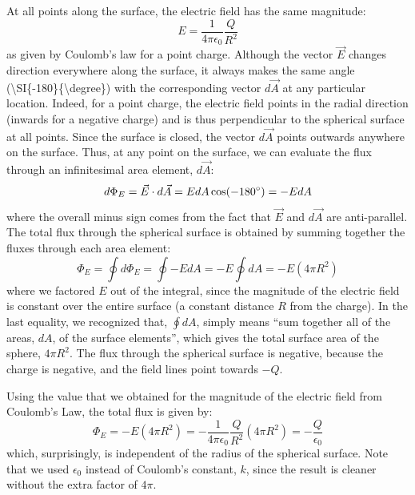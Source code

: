 \begin{framed}
\begin{framed}
At all points along the surface, the electric field has the same magnitude:
\begin{equation}
E=\frac{1}{4\pi\epsilon_0}\frac{Q}{R^2}
\end{equation}
as given by Coulomb's law for a point charge. Although the vector $\vec E$ changes direction everywhere along the surface, it always makes the same angle ({\textbackslash}SI\{-180\}\{{\textbackslash}degree\}) with the corresponding vector $d\vec A$ at any particular location. Indeed, for a point charge, the electric field points in the radial direction (inwards for a negative charge) and is thus perpendicular to the spherical surface at all points. Since the surface is closed, the vector $d\vec A$ points outwards anywhere on the surface. Thus, at any point on the surface, we can evaluate the flux through an infinitesimal area element, $d\vec A$:
\begin{equation}
d\Phi_E=\vec E\cdot d\vec A=EdA\cos(-180\degree)=-EdA
\end{equation}
where the overall minus sign comes from the fact that $\vec E$ and $d\vec A$ are anti-parallel. The total flux through the spherical surface is obtained by summing together the fluxes through each area element:
\begin{equation}
\Phi_E=\oint d\Phi_E=\oint -EdA=-E\oint dA=-E(4\pi R^2)
\end{equation}
where we factored $E$ out of the integral, since the magnitude of the electric field is constant over the entire surface (a constant distance $R$ from the charge). In the last equality, we recognized that, $\oint dA$, simply means ``sum together all of the areas, $dA$, of the surface elements'', which gives the total surface area of the sphere, $4\pi R^2$. The flux through the spherical surface is negative, because the charge is negative, and the field lines point towards $-Q$.

Using the value that we obtained for the magnitude of the electric field from Coulomb's Law, the total flux is given by:
\begin{equation}
\Phi_E=-E(4\pi R^2)=-\frac{1}{4\pi\epsilon_0}\frac{Q}{R^2}(4\pi R^2)=-\frac{Q}{\epsilon_0}
\end{equation}
which, surprisingly, is independent of the radius of the spherical surface. Note that we used $\epsilon_0$ instead of Coulomb's constant, $k$, since the result is cleaner without the extra factor of $4\pi$.


\end{framed}
\end{framed}
